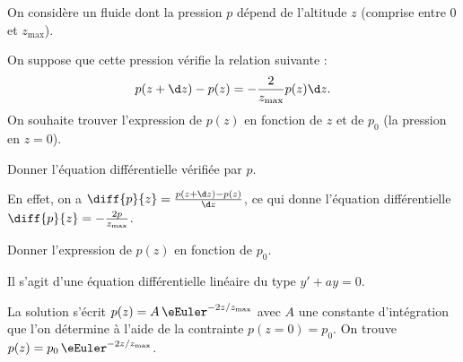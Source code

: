 On considère un fluide dont la pression $p$ dépend de l'altitude $z$ (comprise entre $0$ et $z_{\text{max}}$).

On suppose que cette pression vérifie la relation suivante : 
\[
p(z+\d z) - p(z) = -\frac{2}{z_{\text{max}}} p(z) \d z.
\]
On souhaite trouver l'expression de $p(z)$ en fonction de $z$ et de $p_0$ (la pression en $z=0$).

\debutEntrainement



\begin{enonce}
Donner l'équation différentielle vérifiée par $p$.
\end{enonce}


\begin{corrige}
En effet, on a $\diff{p}{z} = \frac{p(z+\d z)-p(z)}{\d z}$, ce qui donne l'équation différentielle $\diff{p}{z} = -\frac{2p}{z_{\text{max}}}$.
\end{corrige}





\begin{enonce}
Donner l'expression de $p(z)$ en fonction de $p_0$.
\end{enonce}


\begin{corrige}
Il s'agit d'une équation différentielle linéaire du type $y'+ay=0$. 

La solution s'écrit $p(z)=A\,\eEuler^{-2z/z_\text{max}}$ avec $A$ une constante d'intégration que l'on détermine à l'aide de la contrainte $p(z=0)=p_0$. On trouve $p(z)=p_0\, \eEuler^{-2{z}/{z_{\text{max}}}}$.
\end{corrige}


\finEntrainement






